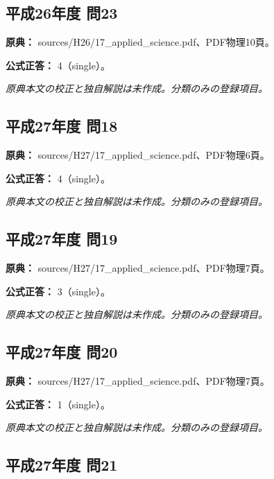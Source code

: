 \subsection{平成26年度 問23}
\label{q:h26-reg-applied-23}

\noindent\textbf{原典：} sources/H26/17\_applied\_science.pdf、PDF物理10頁。

\textbf{公式正答：} 4（single）。

\par\textit{原典本文の校正と独自解説は未作成。分類のみの登録項目。}

\subsection{平成27年度 問18}
\label{q:h27-reg-applied-18}

\noindent\textbf{原典：} sources/H27/17\_applied\_science.pdf、PDF物理6頁。

\textbf{公式正答：} 4（single）。

\par\textit{原典本文の校正と独自解説は未作成。分類のみの登録項目。}

\subsection{平成27年度 問19}
\label{q:h27-reg-applied-19}

\noindent\textbf{原典：} sources/H27/17\_applied\_science.pdf、PDF物理7頁。

\textbf{公式正答：} 3（single）。

\par\textit{原典本文の校正と独自解説は未作成。分類のみの登録項目。}

\subsection{平成27年度 問20}
\label{q:h27-reg-applied-20}

\noindent\textbf{原典：} sources/H27/17\_applied\_science.pdf、PDF物理7頁。

\textbf{公式正答：} 1（single）。

\par\textit{原典本文の校正と独自解説は未作成。分類のみの登録項目。}

\subsection{平成27年度 問21}
\label{q:h27-reg-applied-21}


